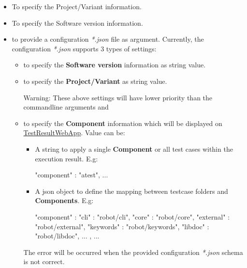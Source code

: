 \begin{itemize}
\item {}

  To specify the {Project/Variant} information.

\item {}

  To specify the {Software version} information.

\item {}

  to provide a configuration \emph{*.json} file as  argument.
  Currently, the configuration \emph{*.json} supports 3 types of settings:

  \begin{itemize}
  \item {} to specify the \textbf{Software version} information as string value.
  \item {} to specify the \textbf{Project/Variant} as string value.
  \begin{boxwarning} {Warning:}
    These above settings will have lower priority than the commandline arguments
     and 
  \end{boxwarning}

  \item {} to specify the \textbf{Component} information
        which will be displayed on
        \href{https://github.com/test-fullautomation/testresultwebapp}{TestResultWebApp}.
        Value can be:
        \begin{itemize}
          \item A string to apply a single \textbf{Component} or all test cases 
                within the execution result. E.g:
\begin{robotcode}
{
  "component" : "atest",
  ...
}
\end{robotcode}
          \item A json object to define the mapping between testcase folders and 
                \textbf{Components}. E.g:
\begin{robotcode}
  {
    "component" : {
      "cli"       : "robot/cli",
      "core"      : "robot/core",
      "external"  : "robot/external",
      "keywords"  : "robot/keywords",
      "libdoc"    : "robot/libdoc",
      ...
    },
    ...
  }
\end{robotcode}
        \end{itemize}
        The error will be occurred when the provided configuration
        \emph{*.json} schema is not correct.
  \end{itemize}
        


\end{itemize}
